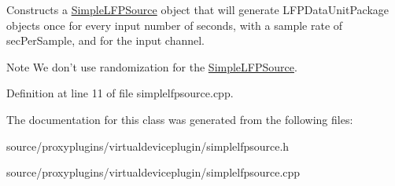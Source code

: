 Constructs a \hyperlink{class_simple_l_f_p_source}{Simple\-L\-F\-P\-Source} object that will generate L\-F\-P\-Data\-Unit\-Package objects once for every input number of seconds, with a sample rate of sec\-Per\-Sample, and for the input channel. 

\begin{DoxyNote}{Note}
We don't use randomization for the \hyperlink{class_simple_l_f_p_source}{Simple\-L\-F\-P\-Source}. 
\end{DoxyNote}


Definition at line 11 of file simplelfpsource.\-cpp.



The documentation for this class was generated from the following files\-:\begin{DoxyCompactItemize}
\item 
source/proxyplugins/virtualdeviceplugin/simplelfpsource.\-h\item 
source/proxyplugins/virtualdeviceplugin/simplelfpsource.\-cpp\end{DoxyCompactItemize}
